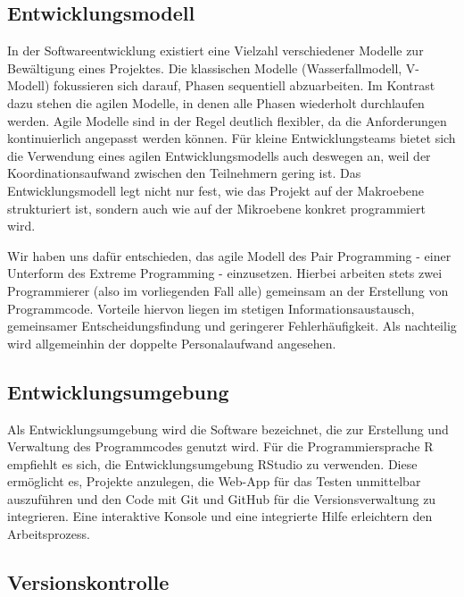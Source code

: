 \documentclass[
]{article}
\begin{document}
\hypertarget{entwicklungsmodell}{%
\subsection{Entwicklungsmodell}\label{entwicklungsmodell}}

In der Softwareentwicklung existiert eine Vielzahl verschiedener Modelle zur Bewältigung eines Projektes. Die klassischen Modelle (Wasserfallmodell, V-Modell) fokussieren sich darauf, Phasen sequentiell abzuarbeiten. Im Kontrast dazu stehen die agilen Modelle, in denen alle Phasen wiederholt durchlaufen werden. Agile Modelle sind in der Regel deutlich flexibler, da die Anforderungen kontinuierlich angepasst werden können. Für kleine Entwicklungsteams bietet sich die Verwendung eines agilen Entwicklungsmodells auch deswegen an, weil der Koordinationsaufwand zwischen den Teilnehmern gering ist. Das Entwicklungsmodell legt nicht nur fest, wie das Projekt auf der Makroebene strukturiert ist, sondern auch wie auf der Mikroebene konkret programmiert wird.

Wir haben uns dafür entschieden, das agile Modell des Pair Programming - einer Unterform des Extreme Programming - einzusetzen. Hierbei arbeiten stets zwei Programmierer (also im vorliegenden Fall alle) gemeinsam an der Erstellung von Programmcode. Vorteile hiervon liegen im stetigen Informationsaustausch, gemeinsamer Entscheidungsfindung und geringerer Fehlerhäufigkeit. Als nachteilig wird allgemeinhin der doppelte Personalaufwand angesehen.

\hypertarget{entwicklungsumgebung}{%
\subsection{Entwicklungsumgebung}\label{entwicklungsumgebung}}

Als Entwicklungsumgebung wird die Software bezeichnet, die zur Erstellung und Verwaltung des Programmcodes genutzt wird. Für die Programmiersprache R empfiehlt es sich, die Entwicklungsumgebung RStudio zu verwenden. Diese ermöglicht es, Projekte anzulegen, die Web-App für das Testen unmittelbar auszuführen und den Code mit Git und GitHub für die Versionsverwaltung zu integrieren. Eine interaktive Konsole und eine integrierte Hilfe erleichtern den Arbeitsprozess.

\hypertarget{versionskontrolle}{%
\subsection{Versionskontrolle}\label{versionskontrolle}}
\end{document}
